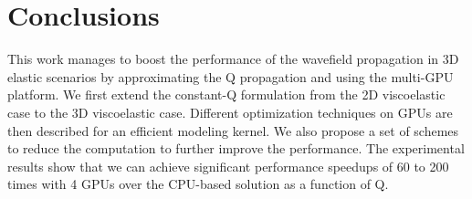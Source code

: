\documentclass{paris17}
\begin{document}
\section{Conclusions}

This work manages to boost the performance of the wavefield propagation in 3D elastic scenarios by approximating the Q propagation and using the multi-GPU platform. We first extend the constant-Q formulation from the 2D viscoelastic case to the 3D viscoelastic case. Different optimization techniques on GPUs are then described for an efficient modeling kernel. We also propose a set of schemes to reduce the computation to further improve the performance. The experimental results show that we can achieve significant performance speedups of 60 to 200 times with 4 GPUs over the CPU-based solution as a function of Q.


\end{document}
